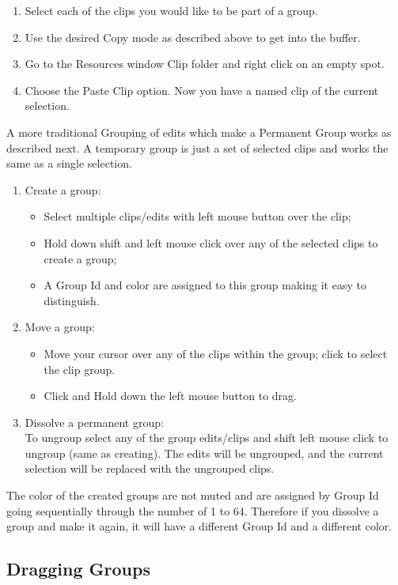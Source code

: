 \begin{enumerate}
\item Select each of the clips you would like to be part of a
  group.
\item Use the desired Copy mode as described above to get into
  the buffer.
\item Go to the Resources window Clip folder and right click on
  an empty spot.
\item Choose the Paste Clip option.  Now you have a named clip
  of the current selection.
\end{enumerate} A more traditional Grouping of edits which make a
Permanent Group works as described next.  A temporary group is just
a set of selected clips and works the same as a single selection.
\begin{enumerate}
\item Create a group:
  \begin{itemize}[noitemsep]
  \item Select multiple clips/edits with left mouse button
    over the clip;
  \item Hold down shift and left mouse click over any of the
    selected clips to create a group;
  \item A Group Id and color are assigned to this group making
    it easy to distinguish.
  \end{itemize}
\item Move a group:
  \begin{itemize}[noitemsep]
  \item Move your cursor over any of the clips within the
    group; click to select the clip group.
  \item Click and Hold down the left mouse button to drag.
  \end{itemize}
\item Dissolve a permanent group:\\
  To ungroup select any of the group edits/clips and shift left
  mouse click to ungroup (same as creating).  The edits will be
  ungrouped, and the current selection will be replaced with the
  ungrouped clips.
\end{enumerate}

The color of the created groups are not muted and are assigned by
Group Id going sequentially through the number of 1 to 64.
Therefore if you dissolve a group and make it again, it will have a
different Group Id and a different color.

\subsection{Dragging Groups}%
\label{sub:dragging_groups}


